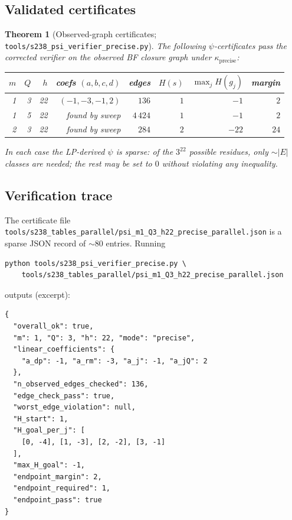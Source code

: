 \documentclass[11pt,a4paper]{article}
\theoremstyle{plain}
\newtheorem{theorem}{Theorem}[section]
\theoremstyle{definition}
\begin{document}
\subsection{Validated certificates}

\begin{theorem}[Observed-graph certificates;
\texttt{tools/s238\_psi\_verifier\_precise.py}]
\label{thm:obs-certs}
The following $\psi$-certificates pass the corrected verifier on
the observed BF closure graph under
$\kappa_{\mathrm{precise}}$:

\begin{center}\footnotesize
\begin{tabular}{rrrrrrrr}
\toprule
$m$ & $Q$ & $h$ & coefs $(a, b, c, d)$ & edges & $H(s)$ & $\max_j H(g_j)$ & margin \\
\midrule
1 & 3 & 22 & $(-1, -3, -1, 2)$ & $136$    & $1$ & $-1$ & $2$ \\
1 & 5 & 22 & found by sweep    & $4\,424$ & $1$ & $-1$ & $2$ \\
2 & 3 & 22 & found by sweep    & $284$    & $2$ & $-22$ & $24$ \\
\bottomrule
\end{tabular}
\end{center}

In each case the LP-derived $\psi$ is sparse: of the $3^{22}$
possible residues, only $\sim$$|E|$ classes are needed; the rest
may be set to $0$ without violating any inequality.
\end{theorem}

\subsection{Verification trace}

The certificate file
\texttt{tools/s238\_tables\_parallel/psi\_m1\_Q3\_h22\_precise\_parallel.json}
is a sparse JSON record of $\sim$80 entries. Running

\begin{lstlisting}
python tools/s238_psi_verifier_precise.py \
    tools/s238_tables_parallel/psi_m1_Q3_h22_precise_parallel.json
\end{lstlisting}

outputs (excerpt):

\begin{lstlisting}
{
  "overall_ok": true,
  "m": 1, "Q": 3, "h": 22, "mode": "precise",
  "linear_coefficients": {
    "a_dp": -1, "a_rm": -3, "a_j": -1, "a_jQ": 2
  },
  "n_observed_edges_checked": 136,
  "edge_check_pass": true,
  "worst_edge_violation": null,
  "H_start": 1,
  "H_goal_per_j": [
    [0, -4], [1, -3], [2, -2], [3, -1]
  ],
  "max_H_goal": -1,
  "endpoint_margin": 2,
  "endpoint_required": 1,
  "endpoint_pass": true
}
\end{lstlisting}
\end{document}
